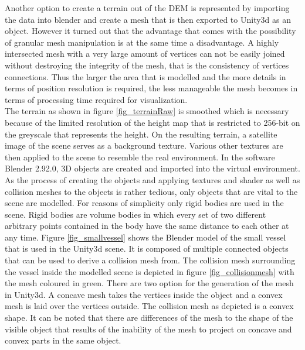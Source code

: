 Another option to create a terrain out of the \ac{DEM} is represented by importing the data into blender and create a mesh that is then exported to Unity3d as an object. However it turned out that the advantage that comes with the possibility of granular mesh manipulation is at the same time a disadvantage. A highly intersected mesh with a very large amount of vertices can not be easily joined without destroying the integrity of the mesh, that is the consistency of vertices connections. Thus the larger the area that is modelled and the more details in terms of position resolution is required, the less manageable the mesh becomes in terms of processing time required for visualization.\\

The terrain as shown in figure \ref{fig_terrainRaw} is smoothed which is necessary because of the limited resolution of the height map that is restricted to 256-bit on the greyscale that represents the height. On the resulting terrain, a satellite image of the scene serves as a background texture. Various other textures are then applied to the scene to resemble the real environment. In the software Blender 2.92.0, 3D objects are created and imported into the virtual environment. As the process of creating the objects and applying textures and shader as well as collision meshes to the objects is rather tedious, only objects that are vital to the scene are modelled. For reasons of simplicity only rigid bodies are used in the scene. Rigid bodies are volume bodies in which every set of two different arbitrary points contained in the body have the same distance to each other at any time. Figure \ref{fig_smallvessel} shows the Blender model of the small vessel that is used in the Unity3d scene. It is composed of multiple connected objects that can be used to derive a collision mesh from. The collision mesh surrounding the vessel inside the modelled scene is depicted in figure \ref{fig_collisionmesh} with the mesh coloured in green. There are two option for the generation of the mesh in Unity3d. A concave mesh takes the vertices inside the object and a convex mesh is laid over the vertices outside. The collision mesh as depicted is a convex shape. It can be noted that there are differences of the mesh to the shape of the visible object that results of the inability of the mesh to project on concave and convex parts in the same object.\\

